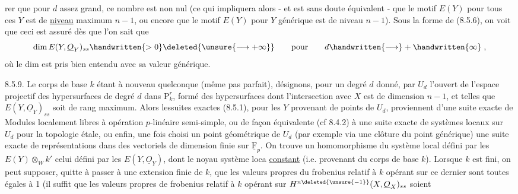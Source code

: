 %
rer que pour $d$ assez grand, ce nombre est non nul (ce qui impliquera  alors\deleted{\unsure{,}} - et est sans doute équivalent - que le motif $E(Y)$ pour tous ces $Y$ est de \uline{niveau} maximum $n-1$, ou encore que le motif $E(Y)$ pour $Y$ générique est de niveau $n-1$). Sous la forme de (8.5.6)\deleted{\unsure{,}}, on voit que ceci est assuré dès que l'on sait que
\[
\dim E(Y,\underline O_Y)_{ss}\handwritten{>0}\deleted{\unsure{\longrightarrow+\infty}}\qquad\text{pour}\qquad d\handwritten{\longrightarrow}+\handwritten{\infty}\;,
\]
où le dim est pris bien entendu avec sa valeur générique. 

8.5.9. Le corps de base $k$ étant à nouveau quelconque (même pas  parfait), désignons, pour un degré $d$ donné, par $U_d$ l'ouvert de l'espace projectif des hypersurfaces de degré $d$ dans $\mathrm P^r_k$, formé des hypersurfaces dont l'intersection avec $X$ est   de dimension $n-1$, et telles que $E(Y,\underline O_Y)_{ss}$ soit de rang maximum. Alors lessuites exactes (8.5.1), pour les $Y$ provenant de points de $U_d$, proviennent d'une suite exacte de Modules localement libres  à opération $p$-linéaire semi-simple, ou de façon équivalente (cf 8.4.2) à une suite exacte de systèmes locaux  sur $U_d$ pour la topologie étale,  ou enfin, une fois choisi un point géométrique de $U_d$ (par exemple via une clôture  du point générique) une suite exacte de représentations  dans des vectoriels de dimension finie sur $\underline{\mathrm F}_p$.  On trouve un homomorphisme \inserted{\handwritten{$\varphi$}} du système local défini par les $E(Y)\otimes_W k'$   celui défini par les $E(Y,\underline O_Y)$, dont le noyau   système loca \uline{constant} (i.e. provenant du corps de base $k$). Lorsque $k$ est fini, on peut supposer, quitte à passer à une extension finie de $k$, que les valeurs propres du frobenius relatif à $k$ opérant sur ce dernier  sont toutes égales à 1 (il suffit que les valeurs propres de frobenius relatif à $k$ opérant sur  $H^{n\deleted{\unsure{-1}}}(X,\underline O_X)_{ss}$  soient
